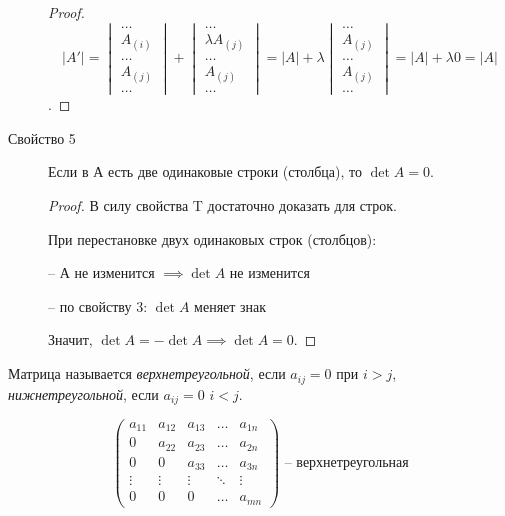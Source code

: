 \begin{description}
\begin{proof}
        \begin{equation*}
            |A'| = \begin{vmatrix}
                \dots \\ A_{(i)} \\ \dots \\ A_{(j)} \\ \dots
            \end{vmatrix} + \begin{vmatrix}
                \dots \\ \lambda A_{(j)} \\ \dots \\ A_{(j)} \\ \dots
            \end{vmatrix} = |A| + \lambda \begin{vmatrix}
                \dots \\ A_{(j)} \\ \dots \\ A_{(j)} \\ \dots
            \end{vmatrix} = |A| + \lambda 0 = |A|
        \end{equation*}.
    \end{proof}

\item[Свойство 5]
    Если в А есть две одинаковые строки (столбца), то $\det A = 0$.
    \begin{proof}
        В силу свойства T достаточно доказать для строк.

        При перестановке двух одинаковых строк (столбцов):

        -- А не изменится $\implies \det A$ не изменится

        -- по свойству 3: $\det A$ меняет знак

        Значит, $\det A = -\det A \implies \det A = 0$.
    \end{proof}
\end{description}


\begin{definition}
    Матрица называется \textit{верхнетреугольной}, если $a_{ij} = 0$ при $i > j$, \textit{нижнетреугольной}, если $a_{ij} = 0$ $i < j$.
\end{definition}
\begin{equation*}
    \begin{pmatrix}
        a_{11} & a_{12} & a_{13} & \dots & a_{1n} \\
        0 & a_{22} & a_{23} & \dots & a_{2n} \\
        0 & 0 & a_{33} & \dots & a_{3n} \\
        \vdots & \vdots & \vdots & \ddots & \vdots \\
        0 & 0 & 0 & \dots & a_{mn}
	\end{pmatrix} \text{ -- верхнетреугольная}
\end{equation*}

